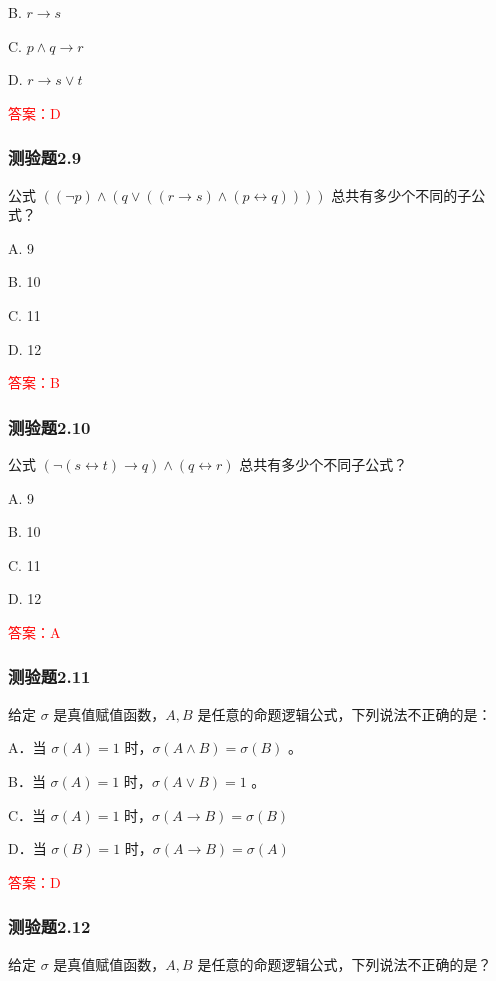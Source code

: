 \documentclass[UTF8, heading=true]{ctexart}
\begin{document}
B. $r \rightarrow s$

C. $p \wedge q \rightarrow r$

D. $r \rightarrow s \vee t$

\textcolor{red}{答案：D}


\subsubsection{测验题2.9}

公式 $((\neg p) \wedge(q \vee((r \rightarrow s) \wedge(p \leftrightarrow q))))$ 总共有多少个不同的子公式？

A. 9

B. 10

C. 11

D. 12

\textcolor{red}{答案：B}

\subsubsection{测验题2.10}

公式 $(\neg(s \leftrightarrow t) \rightarrow q) \wedge(q \leftrightarrow r)$ 总共有多少个不同子公式？

A. 9

B. 10

C. 11

D. 12

\textcolor{red}{答案：A}

\subsubsection{测验题2.11}

给定 $\sigma$ 是真值赋值函数，$A, B$ 是任意的命题逻辑公式，下列说法不正确的是：

A．当 $\sigma(A)=1$ 时，$\sigma(A \wedge B)=\sigma(B)$ 。

B．当 $\sigma(A)=1$ 时，$\sigma(A \vee B)=1$ 。

C．当 $\sigma(A)=1$ 时，$\sigma(A \rightarrow B)=\sigma(B)$

D．当 $\sigma(B)=1$ 时，$\sigma(A \rightarrow B)=\sigma(A)$

\textcolor{red}{答案：D}

\subsubsection{测验题2.12}

给定 $\sigma$ 是真值赋值函数，$A, B$ 是任意的命题逻辑公式，下列说法不正确的是？
\end{document}
